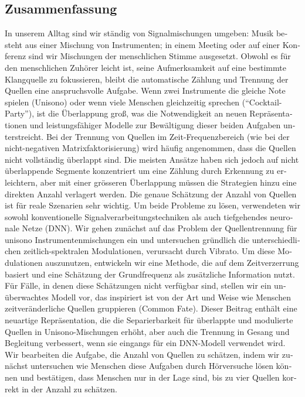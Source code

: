 \vfill

\begin{otherlanguage}{ngerman}
\chapter*{Zusammenfassung}

In unserem Alltag sind wir ständig von Signalmischungen umgeben: Musik  besteht aus einer Mischung von Instrumenten; in einem Meeting oder auf einer Konferenz sind wir Mischungen der menschlichen Stimme ausgesetzt.
Obwohl es für den menschlichen Zuhörer leicht ist, seine Aufmerksamkeit auf eine bestimmte Klangquelle zu fokussieren, bleibt die automatische Zählung und Trennung der Quellen eine anspruchsvolle Aufgabe.
Wenn zwei Instrumente die gleiche Note spielen (Unisono) oder wenn viele Menschen gleichzeitig sprechen (``Cocktail-Party''), ist die Überlappung groß, was die Notwendigkeit an neuen Repräsentationen und leistungsfähiger Modelle zur Bewältigung dieser beiden Aufgaben unterstreicht.
Bei der Trennung von Quellen im Zeit-Frequenzbereich (wie bei der nicht-negativen Matrixfaktorisierung) wird häufig angenommen, dass die Quellen nicht vollständig überlappt sind.
Die meisten Ansätze haben sich jedoch auf nicht überlappende Segmente konzentriert um eine Zählung durch Erkennung zu erleichtern, aber mit einer grösseren Überlappung müssen die Strategien hinzu eine direkten  Anzahl verlagert werden.
Die genaue Schätzung der Anzahl von Quellen ist für reale Szenarien sehr wichtig.
Um beide Probleme zu lösen, verwendeten wir sowohl konventionelle Signalverarbeitungstechniken als auch tiefgehendes neuronale Netze (DNN).
Wir gehen zunächst auf das Problem der Quellentrennung für unisono Instrumentenmischungen ein und untersuchen gründlich die unterschiedlichen zeitlich-spektralen Modulationen, verursacht durch Vibrato. 
Um diese Modulationen auszunutzen, entwickeln wir eine Methode, die auf dem Zeitverzerrung basiert und eine Schätzung der Grundfrequenz als zusätzliche Information nutzt.
Für Fälle, in denen diese Schätzungen nicht verfügbar sind, stellen wir ein unüberwachtes Modell vor, das inspiriert ist von der Art und Weise  wie Menschen zeitveränderliche Quellen gruppieren (Common Fate).
Dieser Beitrag enthält eine neuartige Repräsentation, die die Separierbarkeit für überlappte und modulierte Quellen in  Unisono-Mischungen erhöht, aber auch die Trennung in Gesang und Begleitung verbessert, wenn sie eingangs für ein DNN-Modell verwendet wird.
Wir bearbeiten die Aufgabe, die Anzahl von Quellen zu schätzen, indem wir zunächst untersuchen wie Menschen diese Aufgaben durch Hörversuche lösen können und bestätigen, dass Menschen nur in der Lage sind, bis zu vier Quellen korrekt in der Anzahl zu schätzen.

\end{otherlanguage}

